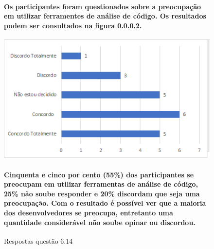\begin{figure}[!t]
\centering
\paragraph{Os participantes foram questionados sobre a preocupação em utilizar ferramentes de análise de código. Os resultados podem ser consultados na figura \ref{fig:6.14}.}
\includegraphics[scale=0.7]{figuras das questoes/6.14.png}
\caption{Respostas questão 6.14}
\paragraph{Cinquenta e cinco por cento (55{\%}) dos participantes se preocupam em utilizar ferramentas de análise de código, 25{\%} não soube responder e 20{\%} discordam que seja uma preocupação. Com o resultado é possível ver que a maioria dos desenvolvedores se preocupa, entretanto uma quantidade considerável não soube opinar ou discordou.}
\label{fig:6.14}
\end{figure}
